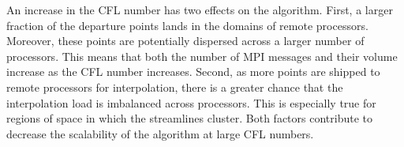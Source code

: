 An increase in the CFL number has two effects on the algorithm. First, a larger fraction of the departure points lands in the domains of remote processors. Moreover, these points are potentially dispersed across a larger number of processors. This means that both the number of MPI messages and their volume increase as the CFL number increases. Second, as more points are shipped to remote processors for interpolation, there is a greater chance that the interpolation load is imbalanced across processors. This is especially true for regions of space in which the streamlines cluster. Both factors contribute to decrease the scalability of the algorithm at large CFL numbers. 
\begin{figure}[htbp]
	\begin{center}
		\\

\end{center}
\end{figure}
